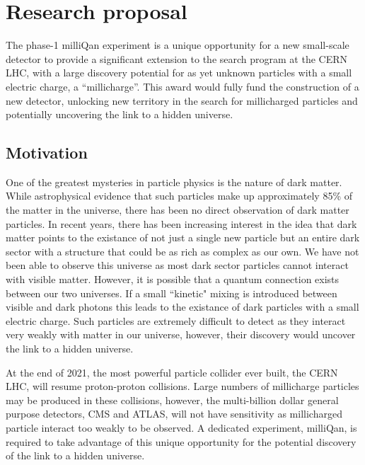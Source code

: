 \documentclass[11pt]{article}
\theoremstyle{plain} \numberwithin{equation}{section}
\theoremstyle{definition}
\begin{document}
\section*{Research proposal}
\noindent 

The phase-1 milliQan experiment is a unique opportunity for a 
new small-scale detector to provide a significant extension to the search 
program at the CERN LHC, with a large discovery potential 
for as yet unknown particles with a small electric charge, a ``millicharge''. 
This award would fully fund the construction of a new detector,
unlocking new territory in the search for millicharged particles and
potentially uncovering the link to a hidden universe.

\subsection*{Motivation}

One of the greatest mysteries in particle physics is the nature of dark matter.
While astrophysical evidence that such particles make up approximately 85\% of the matter
in the universe, there has been no direct observation of dark matter particles. In recent years, 
there has been increasing interest in the idea that dark matter points to the 
existance of not just a single new particle but an entire dark sector 
with a structure that could be as rich as complex as our own. We have not been able to
observe this universe as most dark sector particles cannot interact with
visible matter. However, it is possible that a quantum connection exists between our two universes. 
If a small ``kinetic" mixing is introduced between visible and dark photons this
leads to the existance of dark particles with a small electric charge.
Such particles are extremely difficult to detect as they interact very weakly with
matter in our universe, however, their discovery would uncover the link to 
a hidden universe.

At the end of 2021, the most powerful particle collider ever built, the CERN LHC, 
will resume proton-proton collisions. Large numbers of millicharge particles may be 
produced in these collisions, however, the multi-billion dollar general purpose
detectors, CMS and ATLAS, will not have sensitivity as millicharged particle interact
too weakly to be observed. A dedicated experiment, milliQan, is required to take advantage of 
this unique opportunity for the potential discovery of the link to a hidden universe.
\end{document}
